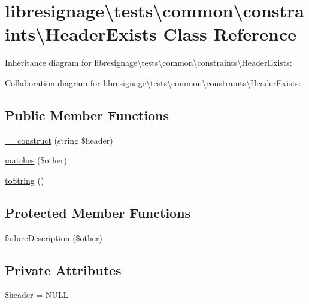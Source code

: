 \hypertarget{classlibresignage_1_1tests_1_1common_1_1constraints_1_1HeaderExists}{}\section{libresignage\textbackslash{}tests\textbackslash{}common\textbackslash{}constraints\textbackslash{}Header\+Exists Class Reference}
\label{classlibresignage_1_1tests_1_1common_1_1constraints_1_1HeaderExists}


Inheritance diagram for libresignage\textbackslash{}tests\textbackslash{}common\textbackslash{}constraints\textbackslash{}Header\+Exists\+:


Collaboration diagram for libresignage\textbackslash{}tests\textbackslash{}common\textbackslash{}constraints\textbackslash{}Header\+Exists\+:
\subsection*{Public Member Functions}
\begin{DoxyCompactItemize}
\item 
\hyperlink{classlibresignage_1_1tests_1_1common_1_1constraints_1_1HeaderExists_a577855265dec0a897f10c7f8e83cee75}{\+\_\+\+\_\+construct} (string \$header)
\item 
\hyperlink{classlibresignage_1_1tests_1_1common_1_1constraints_1_1HeaderExists_a2e7ea3a623adf2a48a40898243b5de40}{matches} (\$other)
\item 
\hyperlink{classlibresignage_1_1tests_1_1common_1_1constraints_1_1HeaderExists_afe191e9942cb0c21e7740ada9d0b4b0a}{to\+String} ()
\end{DoxyCompactItemize}
\subsection*{Protected Member Functions}
\begin{DoxyCompactItemize}
\item 
\hyperlink{classlibresignage_1_1tests_1_1common_1_1constraints_1_1HeaderExists_a95346981cc3a002b2a6f9d66938325c4}{failure\+Description} (\$other)
\end{DoxyCompactItemize}
\subsection*{Private Attributes}
\begin{DoxyCompactItemize}
\item 
\hyperlink{classlibresignage_1_1tests_1_1common_1_1constraints_1_1HeaderExists_a72329aa41df939373ebf6c23f9a0f0ad}{\$header} = N\+U\+LL
\end{DoxyCompactItemize}


